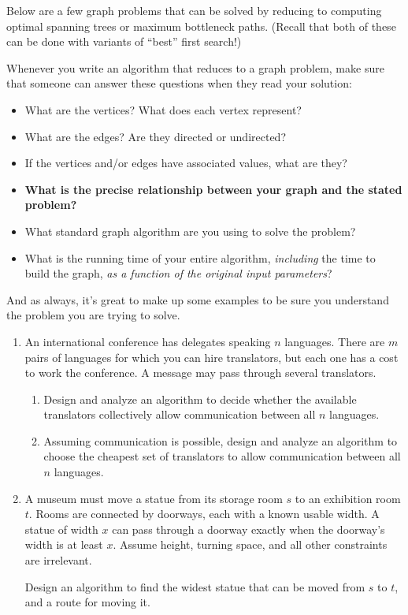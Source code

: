 \documentclass[11pt]{article}
\begin{document}
Below are a few graph problems that can be solved by reducing to
computing optimal spanning trees or maximum bottleneck paths. (Recall that
both of these can be done with variants of ``best'' first search!)

Whenever you write an algorithm that reduces to a graph problem, make sure that someone
can answer these questions when they read your solution:

\begin{itemize}
\item What are the vertices?  What does each vertex represent?
\item What are the edges?  Are they directed or undirected?
\item If the vertices and/or edges have associated values, what are they?
\item \textbf{What is the precise relationship between your graph and the stated problem?}
\item What standard graph algorithm are you using to solve the problem?
\item What is the running time of your entire algorithm, \emph{including} the time to build the graph, \emph{as a function of the original input parameters}?
\end{itemize}

And as always, it's great to make up some examples to be sure you understand the problem
you are trying to solve.

\begin{enumerate}
    \item An international conference has delegates speaking $n$ languages. There are $m$ pairs
    of languages for which you can hire translators, but each one has a cost to
    work the conference. A message may
    pass through several translators.

    \begin{enumerate}
        \item Design and analyze an algorithm to decide whether the available translators
        collectively allow communication between all $n$ languages.
        \item Assuming communication is possible, design and analyze an algorithm to choose
        the cheapest set of translators to allow communication between all $n$ languages.
    \end{enumerate}
    
\item

A museum must move a statue from its storage room $s$ to an exhibition room
$t$. Rooms are connected by doorways, each with a known usable width. A statue
of width $x$ can pass through a doorway exactly when the doorway's width is at
least $x$. Assume height, turning space, and all other constraints are
irrelevant.

Design an algorithm to find the widest statue that can be moved from $s$ to
$t$, and a route for moving it.

\end{enumerate}


\end{document}
